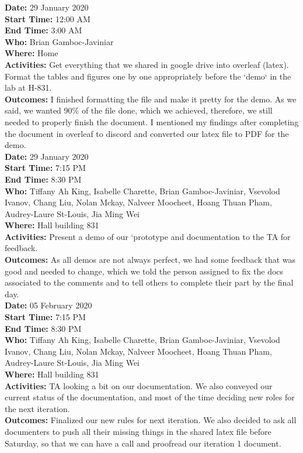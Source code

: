 \documentclass[12pt]{article}
\begin{document}
{\bf Date:} 29 January 2020\\
{\bf Start Time:} 12:00 AM\\
{\bf End Time:} 3:00 AM \\
{\bf Who:} Brian Gamboc-Javiniar\\
{\bf Where:} Home \\
{\bf Activities:} Get everything that we shared in google drive into overleaf (latex). Format the tables and figures one by one appropriately before the `demo` in the lab at H-831.\\
{\bf Outcomes:} I finished formatting the file and make it pretty for the demo. As we said, we wanted 90\% of the file done, which we achieved, therefore, we still needed to properly finish the document. I mentioned my findings after completing the document in overleaf to discord and converted our latex file to PDF for the demo.\\

{\bf Date:} 29 January 2020\\
{\bf Start Time:} 7:15 PM\\
{\bf End Time:} 8:30 PM \\
{\bf Who:} Tiffany Ah King, Isabelle Charette, Brian Gamboc-Javiniar, Vsevolod Ivanov, Chang Liu, Nolan Mckay, Nalveer Moocheet, Hoang Thuan Pham, Audrey-Laure St-Louis, Jia Ming Wei\\
{\bf Where:} Hall building 831 \\
{\bf Activities:} Present a demo of our `prototype and documentation to the TA for feedback.\\
{\bf Outcomes:} As all demos are not always perfect, we had some feedback that was good and needed to change, which we told the person assigned to fix the docs associated to the comments and to tell others to complete their part by the final day.\\

{\bf Date:} 05 February 2020\\
{\bf Start Time:} 7:15 PM\\
{\bf End Time:} 8:30 PM \\
{\bf Who:} Tiffany Ah King, Isabelle Charette, Brian Gamboc-Javiniar, Vsevolod Ivanov, Chang Liu, Nolan Mckay, Nalveer Moocheet, Hoang Thuan Pham, Audrey-Laure St-Louis, Jia Ming Wei\\
{\bf Where:} Hall building 831 \\
{\bf Activities:} TA looking a bit on our documentation. We also conveyed our current status of the documentation, and most of the time deciding new roles for the next iteration.\\
{\bf Outcomes:} Finalized our new rules for next iteration. We also decided to ask all documenters to push all their missing things in the shared latex file before Saturday, so that we can have a call and proofread our iteration 1 document.\\
\end{document}
